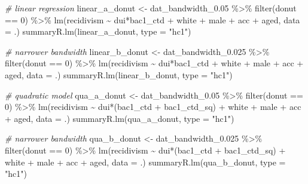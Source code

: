 \documentclass[
  11pt,
]{article}
\newenvironment{Shaded}{\begin{snugshade}}{\end{snugshade}}
\newcommand{\AttributeTok}[1]{\textcolor[rgb]{0.77,0.63,0.00}{#1}}
\newcommand{\CommentTok}[1]{\textcolor[rgb]{0.56,0.35,0.01}{\textit{#1}}}
\newcommand{\DecValTok}[1]{\textcolor[rgb]{0.00,0.00,0.81}{#1}}
\newcommand{\FloatTok}[1]{\textcolor[rgb]{0.00,0.00,0.81}{#1}}
\newcommand{\FunctionTok}[1]{\textcolor[rgb]{0.00,0.00,0.00}{#1}}
\newcommand{\NormalTok}[1]{#1}
\newcommand{\OtherTok}[1]{\textcolor[rgb]{0.56,0.35,0.01}{#1}}
\newcommand{\SpecialCharTok}[1]{\textcolor[rgb]{0.00,0.00,0.00}{#1}}
\newcommand{\StringTok}[1]{\textcolor[rgb]{0.31,0.60,0.02}{#1}}
\begin{document}
\begin{Shaded}
\begin{Highlighting}[]
\CommentTok{\# linear regression}
\NormalTok{linear\_a\_donut }\OtherTok{\textless{}{-}} 
\NormalTok{  dat\_bandwidth\_0}\FloatTok{.05} \SpecialCharTok{\%\textgreater{}\%} 
  \FunctionTok{filter}\NormalTok{(donut }\SpecialCharTok{==} \DecValTok{0}\NormalTok{) }\SpecialCharTok{\%\textgreater{}\%} 
  \FunctionTok{lm}\NormalTok{(recidivism }\SpecialCharTok{\textasciitilde{}}\NormalTok{ dui}\SpecialCharTok{*}\NormalTok{bac1\_ctd }\SpecialCharTok{+}\NormalTok{ white }\SpecialCharTok{+}\NormalTok{ male }\SpecialCharTok{+}\NormalTok{ acc }\SpecialCharTok{+}\NormalTok{ aged,}
     \AttributeTok{data =}\NormalTok{ .)}
\FunctionTok{summaryR.lm}\NormalTok{(linear\_a\_donut, }\AttributeTok{type =} \StringTok{"hc1"}\NormalTok{)}

\CommentTok{\# narrower bandwidth}
\NormalTok{linear\_b\_donut }\OtherTok{\textless{}{-}} 
\NormalTok{  dat\_bandwidth\_0}\FloatTok{.025} \SpecialCharTok{\%\textgreater{}\%} 
  \FunctionTok{filter}\NormalTok{(donut }\SpecialCharTok{==} \DecValTok{0}\NormalTok{) }\SpecialCharTok{\%\textgreater{}\%} 
  \FunctionTok{lm}\NormalTok{(recidivism }\SpecialCharTok{\textasciitilde{}}\NormalTok{ dui}\SpecialCharTok{*}\NormalTok{bac1\_ctd }\SpecialCharTok{+}\NormalTok{ white }\SpecialCharTok{+}\NormalTok{ male }\SpecialCharTok{+}\NormalTok{ acc }\SpecialCharTok{+}\NormalTok{ aged,}
     \AttributeTok{data =}\NormalTok{ .)}
\FunctionTok{summaryR.lm}\NormalTok{(linear\_b\_donut, }\AttributeTok{type =} \StringTok{"hc1"}\NormalTok{)}

\CommentTok{\# quadratic model}
\NormalTok{qua\_a\_donut }\OtherTok{\textless{}{-}} 
\NormalTok{  dat\_bandwidth\_0}\FloatTok{.05} \SpecialCharTok{\%\textgreater{}\%} 
  \FunctionTok{filter}\NormalTok{(donut }\SpecialCharTok{==} \DecValTok{0}\NormalTok{) }\SpecialCharTok{\%\textgreater{}\%} 
  \FunctionTok{lm}\NormalTok{(recidivism }\SpecialCharTok{\textasciitilde{}}\NormalTok{ dui}\SpecialCharTok{*}\NormalTok{(bac1\_ctd }\SpecialCharTok{+}\NormalTok{ bac1\_ctd\_sq) }\SpecialCharTok{+}\NormalTok{ white }\SpecialCharTok{+}\NormalTok{ male }\SpecialCharTok{+}\NormalTok{ acc }\SpecialCharTok{+}\NormalTok{ aged,}
     \AttributeTok{data =}\NormalTok{ .)}
\FunctionTok{summaryR.lm}\NormalTok{(qua\_a\_donut, }\AttributeTok{type =} \StringTok{"hc1"}\NormalTok{)}

\CommentTok{\# narrower bandwidth}
\NormalTok{qua\_b\_donut }\OtherTok{\textless{}{-}} 
\NormalTok{  dat\_bandwidth\_0}\FloatTok{.025} \SpecialCharTok{\%\textgreater{}\%} 
  \FunctionTok{filter}\NormalTok{(donut }\SpecialCharTok{==} \DecValTok{0}\NormalTok{) }\SpecialCharTok{\%\textgreater{}\%} 
  \FunctionTok{lm}\NormalTok{(recidivism }\SpecialCharTok{\textasciitilde{}}\NormalTok{ dui}\SpecialCharTok{*}\NormalTok{(bac1\_ctd }\SpecialCharTok{+}\NormalTok{ bac1\_ctd\_sq) }\SpecialCharTok{+}\NormalTok{ white }\SpecialCharTok{+}\NormalTok{ male }\SpecialCharTok{+}\NormalTok{ acc }\SpecialCharTok{+}\NormalTok{ aged,}
     \AttributeTok{data =}\NormalTok{ .)}
\FunctionTok{summaryR.lm}\NormalTok{(qua\_b\_donut, }\AttributeTok{type =} \StringTok{"hc1"}\NormalTok{)}
\end{Highlighting}
\end{Shaded}
\end{document}
